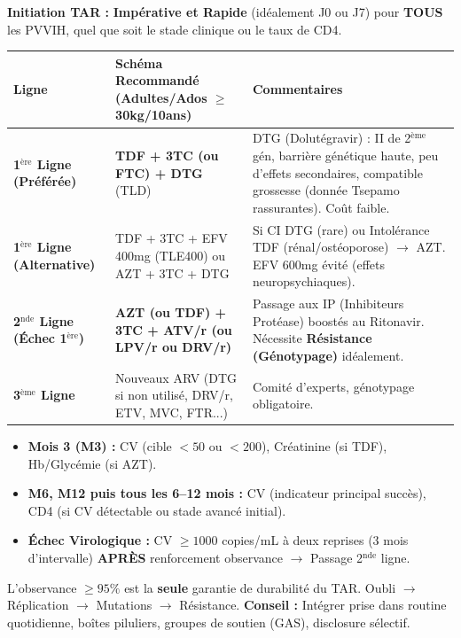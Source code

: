 \documentclass[11pt]{article}
\newcommand{\cle}[1]{{\popxbold\color{popdark}#1}}
\newcounter{popsec}
\newcounter{popsub}
\newcommand{\courssub}[1]{%
  \stepcounter{popsub}%
  \par\vspace{9pt}\noindent{\popxbold\fontsize{11.5}{13}\selectfont\color{popink}{\color{poporange}\thepopsec.\thepopsub}\hspace{6pt}#1}\par\nopagebreak\vspace{4pt}
}
\begin{document}
\begin{bilan}
\courssub{Prise en Charge : TAR et Suivi}
\begin{propriete}
\textbf{Initiation TAR :} \textbf{Impérative et Rapide} (idéalement J0 ou J7) pour \textbf{TOUS} les PVVIH, quel que soit le stade clinique ou le taux de CD4.
\end{propriete}
\begin{center}
\begin{tabularx}{\linewidth}{|l|X|X|}\hline
\rowcolor{popblueL}
\textbf{Ligne} & \textbf{Schéma Recommandé (Adultes/Ados $\ge$ 30kg/10ans)} & \textbf{Commentaires} \\ \hline
\textbf{1$^{\text{ère}}$ Ligne (Préférée)} & \textbf{TDF + 3TC (ou FTC) + DTG} (TLD) & \cle{DTG (Dolutégravir)} : II de 2$^{\text{ème}}$ gén, barrière génétique haute, peu d'effets secondaires, compatible grossesse (donnée Tsepamo rassurantes). Coût faible. \\ \hline
\textbf{1$^{\text{ère}}$ Ligne (Alternative)} & TDF + 3TC + EFV 400mg (TLE400) ou AZT + 3TC + DTG & Si CI DTG (rare) ou Intolérance TDF (rénal/ostéoporose) $\to$ AZT. EFV 600mg évité (effets neuropsychiaques). \\ \hline
\textbf{2$^{\text{nde}}$ Ligne (Échec 1$^{\text{ère}}$)} & \textbf{AZT (ou TDF) + 3TC + ATV/r (ou LPV/r ou DRV/r)} & Passage aux \cle{IP (Inhibiteurs Protéase)} boostés au Ritonavir. Nécessite \textbf{Résistance (Génotypage)} idéalement. \\ \hline
\textbf{3$^{\text{ème}}$ Ligne} & Nouveaux ARV (DTG si non utilisé, DRV/r, ETV, MVC, FTR...) & Comité d'experts, génotypage obligatoire. \\ \hline
\end{tabularx}
\end{center}
\begin{aretenir}
\begin{itemize}
  \item \textbf{Mois 3 (M3) :} CV (cible $< 50$ ou $< 200$), Créatinine (si TDF), Hb/Glycémie (si AZT).
  \item \textbf{M6, M12 puis tous les 6--12 mois :} CV (indicateur principal succès), CD4 (si CV détectable ou stade avancé initial).
  \item \textbf{Échec Virologique :} CV $\ge 1000$ copies/mL à deux reprises (3 mois d'intervalle) \textbf{APRÈS} renforcement observance $\to$ Passage 2$^{\text{nde}}$ ligne.
\end{itemize}
\end{aretenir}
\begin{attention}
L'observance $\ge 95\%$ est la \textbf{seule} garantie de durabilité du TAR. Oubli $\to$ Réplication $\to$ Mutations $\to$ Résistance. \textbf{Conseil :} Intégrer prise dans routine quotidienne, boîtes piluliers, groupes de soutien (GAS), disclosure sélectif.
\end{attention}


\end{bilan}
\end{document}
